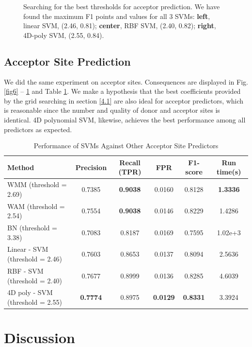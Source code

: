 \documentclass[journal,twoside]{IEEEtran}
\begin{document}
\begin{figure}[htbp]
\caption{Searching for the best thresholds for acceptor prediction. We have found the maximum F1 points and values for all 3 SVMs: \textbf{left}, linear SVM, (2.46, 0.81); \textbf{center}, RBF SVM, (2.40, 0.82); \textbf{right}, 4D-poly SVM, (2.55, 0.84). }
\label{fig7}
\end{figure}

\subsection{Acceptor Site Prediction}\label{4.3}

We did the same experiment on acceptor sites. Consequences are displayed in Fig. \ref{fig6} -- \ref{fig7} and Table \ref{tab3}. We make a hypothesis that the best coefficients provided by the grid searching in section \ref{4.1} are also ideal for acceptor predictors, which is reasonable since the number and quality of donor and acceptor sites is identical. 4D polynomial SVM, likewise, achieves the best performance among all predictors as expected. 

\begin{table}[htbp]
\begin{center}
\begin{threeparttable}
\caption{Performance of SVMs Against Other Acceptor Site Predictors}
\begin{tabular}{lccccc}
\toprule
Method & Precision & Recall (TPR) & FPR & F1-score & Run time(s) \\
\midrule
WMM (threshold = 2.69) & 0.7385 & \textbf{0.9038} & 0.0160 & 0.8128 & \textbf{1.3336} \\
WAM (threshold = 2.54) & 0.7554 & \textbf{0.9038} & 0.0146 & 0.8229 & 1.4286 \\
BN (threshold = 3.38) & 0.7083 & 0.8187 & 0.0169 & 0.7595 & 1.02e+3 \\
Linear - SVM (threshold = 2.46) & 0.7603 & 0.8653 & 0.0137 & 0.8094 & 2.5636 \\
RBF - SVM (threshold = 2.40) & 0.7677 & 0.8999 & 0.0136 & 0.8285 & 4.6039 \\
4D poly - SVM (threshold = 2.55) & \textbf{0.7774} & 0.8975 & \textbf{0.0129} &  \textbf{0.8331} & 3.3924 \\
\bottomrule
\end{tabular}
\label{tab3}
\end{threeparttable}
\end{center}
\end{table}

\section{Discussion}
\end{document}
